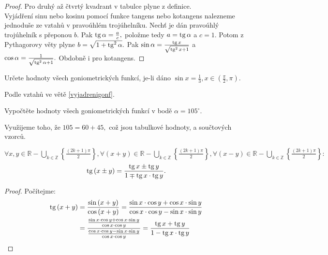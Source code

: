 \begin{proof}
    Pro druhý až čtvrtý kvadrant v tabulce plyne z definice. \\
    Vyjádření sinu nebo kosinu pomocí funkce tangens nebo kotangens nalezneme
    jednoduše ze vztahů v pravoúhlém trojúhelníku. Nechť je dán pravoúhlý trojúhelník
    s přeponou $b.$ Pak $\operatorname{tg} \alpha = \frac{a}{c},$ položme tedy $a = \operatorname{tg} \alpha$ a $c=1. $
    Potom z Pythagorovy věty plyne $b=\sqrt{1+\operatorname{tg}^2 \alpha}. $ Pak $\sin\alpha = \frac{\operatorname{tg} x}{\sqrt{\operatorname{tg}^2 x+1} }$ a
    $\cos \alpha = \frac{1}{\sqrt{\operatorname{tg}^2 \alpha + 1} }.$ Obdobně i pro kotangens.
\end{proof}

\begin{priklad}
Určete hodnoty všech goniometrických funkcí, je-li dáno $\sin x=\frac{1}{3}, x \in \left ( \frac{\pi}{2},\pi \right ). $
\end{priklad}

\begin{reseni}
Podle vztahů ve větě \ref{vyjadrenigonf}.
\end{reseni}

\begin{priklad}
Vypočtěte hodnoty všech goniometrických funkcí v bodě $\alpha = 105^\circ$.
\end{priklad}

\begin{reseni}
Využijeme toho, že $105=60+45,$ což jsou tabulkové hodnoty, a součtových vzorců.
\end{reseni}

\begin{veta}
  $\forall x,y\in\mathbb{R}-\bigcup\limits_{k\in\mathbb{Z}} \left\{\frac{(2k+1)\pi}{2}\right\}, \forall (x+y) \in \mathbb{R}-\bigcup\limits_{k\in\mathbb{Z}} \left\{\frac{(2k+1)\pi}{2}\right\}, \forall (x-y) \in \mathbb{R}-\bigcup\limits_{k\in\mathbb{Z}} \left\{\frac{(2k+1)\pi}{2}\right\}:$
  $$\operatorname{tg}\left(x\pm y\right) = \frac{\operatorname{tg} x \pm \operatorname{tg} y}{1\mp\operatorname{tg} x \cdot \operatorname{tg} y}.$$
\end{veta}
\begin{proof}
    Počítejme:
    \begin{align*}
        \operatorname{tg} \left(x+y\right) & = \frac{\sin \left(x+y\right)}{\cos \left(x+y\right)}=\frac{\sin x\cdot  \cos y + \cos x\cdot  \sin y}{\cos x \cdot \cos y - \sin x\cdot  \sin y} \\
        & = \frac{\frac{\sin x \cdot \cos y + \cos x\cdot  \sin y}{\cos x \cdot \cos y}}{\frac{\cos x\cdot  \cos y - \sin x \cdot \sin y}{\cos x\cdot  \cos y}}=\frac{\operatorname{tg} x + \operatorname{tg} y}{1-\operatorname{tg} x \cdot \operatorname{tg} y}\qedhere
    \end{align*}
\end{proof}


